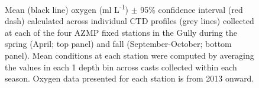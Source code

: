 \documentclass[12pt]{article}\usepackage[]{graphicx}\usepackage[]{color}
\begin{document}
\begin{landscapepage}
\begin{figure}[htb]

{\centering {} 

}

\caption{Mean (black line) oxygen (ml L\textsuperscript{-1}) \(\pm\) 95\% confidence interval (red dash) calculated across individual CTD profiles (grey lines) collected at each of the four AZMP fixed stations in the Gully during the spring (April; top panel) and fall (September-October; bottom panel). Mean conditions at each station were computed by averaging the values in each 1 depth bin across casts collected within each season. Oxygen data presented for each station is from 2013 onward.}\label{fig:figure7}
\end{figure}
\end{landscapepage}
\clearpage
\end{document}

